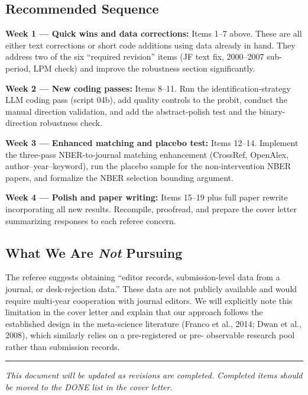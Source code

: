 \documentclass[12pt]{article}
\begin{document}
\subsection*{Recommended Sequence}

\textbf{Week 1 --- Quick wins and data corrections:}
Items 1--7 above.  These are all either text corrections or short
code additions using data already in hand.  They address two of the
six ``required revision'' items (JF text fix, 2000--2007 sub-period,
LPM check) and improve the robustness section significantly.

\textbf{Week 2 --- New coding passes:}
Items 8--11.  Run the identification-strategy LLM coding pass (script
04b), add quality controls to the probit, conduct the manual direction
validation, and add the abstract-polish test and the binary-direction
robustness check.

\textbf{Week 3 --- Enhanced matching and placebo test:}
Items 12--14.  Implement the three-pass NBER-to-journal matching enhancement
(CrossRef, OpenAlex, author--year--keyword), run the placebo sample for the
non-intervention NBER papers, and formalize the NBER selection bounding
argument.

\textbf{Week 4 --- Polish and paper writing:}
Items 15--19 plus full paper rewrite incorporating all new results.
Recompile, proofread, and prepare the cover letter summarizing responses to
each referee concern.

\subsection*{What We Are \emph{Not} Pursuing}

The referee suggests obtaining ``editor records, submission-level data from a
journal, or desk-rejection data.''  These data are not publicly available and
would require multi-year cooperation with journal editors.  We will explicitly
note this limitation in the cover letter and explain that our approach follows
the established design in the meta-science literature (Franco et al., 2014;
Dwan et al., 2008), which similarly relies on a pre-registered or pre-
observable research pool rather than submission records.

\noindent\rule{\linewidth}{0.4pt}
\textit{This document will be updated as revisions are completed.
Completed items should be moved to the DONE list in the cover letter.}
\end{document}
